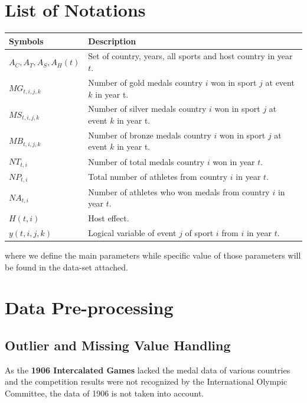 \documentclass{mcmthesis}
\begin{document}
\section{List of Notations}
\begin{center}
\begin{tabular}{ll}
	\toprule
	{\bf Symbols} & {\bf Description}  \\
	\midrule 
	$A_{C},A_{T},A_{S},A_{H}(t)$ & Set of country, years, all sports and host country in year $t$.\\
	$MG_{t,i,j,k}$ & Number of gold medals country $i$ won in sport $j$ at event $k$ in year t. \\
	$MS_{t,i,j,k}$ & Number of silver medals country $i$ won in sport $j$ at event $k$ in year t. \\
	$MB_{t,i,j,k}$ & Number of bronze medals country $i$ won in sport $j$ at event $k$ in year t. \\
	$NT_{t,i}$ & Number of total medals country $i$ won in year $t$. \\
	$NP_{t,i}$ & Total number of athletes from country $i$ in year $t$. \\
	$NA_{t,i}$ & Number of athletes who won medals from country $i$ in year $t$. \\
	$H(t,i)$ & Host effect. \\
	$y(t,i,j,k)$ &  Logical variable of event $j$ of sport $i$ from $i$ in year $t$. \\
	\bottomrule
\end{tabular}
\end{center}

\noindent where we define the main parameters while specific value of those 
parameters will be found in the data-set attached.











\section{Data Pre-processing}

\subsection{Outlier and Missing Value Handling}
As the \textbf{1906 Intercalated Games} lacked the medal data of various countries and the competition results were not recognized by the International Olympic Committee, the data of 1906 is not taken into account.
\end{document}
